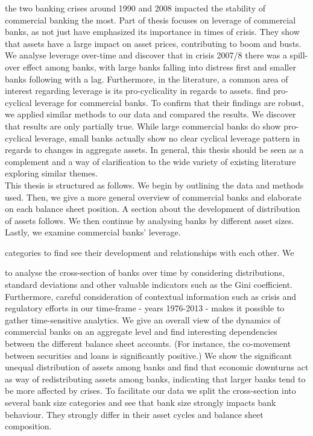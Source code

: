 \documentclass[12pt, a4paper]{article} %
\begin{document}
the two banking crises around 1990 and 2008 impacted the stability of commercial banking the most. Part of thesis focuses on leverage of commercial banks, as not just \citet{geanakoplos2010leverage} have emphasized its importance in times of crisis. They show that assets have a large impact on asset prices, contributing to boom and busts. We analyse leverage over-time and discover that in crisis 2007/8 there was a spill-over effect among banks, with large banks falling into distress first and smaller banks following with a lag.
Furthermore, in the literature, a common area of interest regarding leverage is its pro-cyclicality in regards to assets. \citet{AdrianShin2011} find pro-cyclical leverage for commercial banks. To confirm that their findings are robust, we applied similar methods to our data and compared the results. We discover that \citet{AdrianShin2011} results are only partially true. While large commercial banks do show pro-cyclical leverage, small banks actually show no clear cyclical leverage pattern in regards to changes in aggregate assets.
In general, this thesis should be seen as a complement and a way of clarification to the wide variety of existing literature exploring similar themes. \\
This thesis is structured as follows. We begin by outlining the data and methods used. Then, we give a more general overview of commercial banks and elaborate on each balance sheet position. A section about the development of distribution of assets follows. We then continue by analysing banks by different asset sizes. Lastly, we examine commercial banks' leverage.

\iffalse
 categories to find see their development and relationships with each other. 
We 

to analyse the cross-section of banks over time by considering distributions, standard deviations and other valuable indicators such as the Gini coefficient. Furthermore, careful consideration of contextual information such as crisis and regulatory efforts in our time-frame - years 1976-2013 - makes it possible to gather time-sensitive analytics.
We give an overall view of the dynamics of commercial banks on an aggregate level and find interesting dependencies between the different balance sheet accounts. (For instance, the co-movement between securities and loans is significantly positive.)
We show the significant unequal distribution of assets among banks and find that economic downturns act as way of redistributing assets among banks, indicating that larger banks tend to be more affected by crises.
To facilitate our data we split the cross-section into several bank size categories and see that bank size strongly impacts bank behaviour. They strongly differ in their asset cycles and balance sheet composition.  
\end{document}
